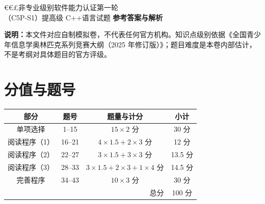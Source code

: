 \documentclass[a4paper]{ctexart}
\begin{document}
\begin{center}
{\dengxian
    {\fontsize{15.95}{1} €€£非专业级别软件能力认证第一轮}\\[1em]
    {\fontsize{14.05}{1}\selectfont （C5P-S1）提高级 C++语言试题 \textbf{参考答案与解析}}
}
\end{center}

\noindent\textbf{说明：}本文件对应自制模拟卷，不代表任何官方机构。知识点级别依据《全国青少年信息学奥林匹克系列竞赛大纲（2025 年修订版）》；题目难度是本卷内部估计，不是考纲对具体题目的官方评级。

\section*{分值与题号}
\begin{center}
\begin{tabular}{c c c c}
\toprule
部分 & 题号 & 题量与计分 & 小计\\
\midrule
单项选择 & 1--15 & $15\times2$ 分 & 30 分\\
阅读程序（1） & 16--21 & $4\times1.5+2\times3$ 分 & 12 分\\
阅读程序（2） & 22--27 & $3\times1.5+3\times3$ 分 & 13.5 分\\
阅读程序（3） & 28--33 & $3\times1.5+2\times3+1\times4$ 分 & 14.5 分\\
完善程序 & 34--43 & $10\times3$ 分 & 30 分\\
\midrule
\multicolumn{3}{r}{总分} & 100 分\\
\bottomrule
\end{tabular}
\end{center}
\end{document}
